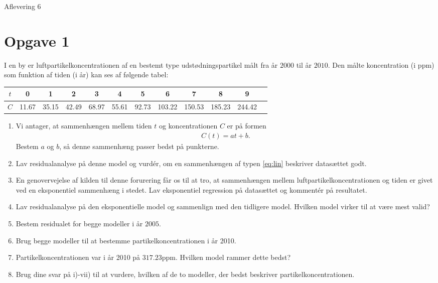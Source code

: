 
\begin{center}
\Huge
Aflevering 6
\end{center}
\section*{Opgave 1}

I en by er luftpartikelkoncentrationen af en bestemt type udstødningspartikel målt fra år $2000$ til år $2010$. Den målte koncentration (i ppm) som funktion af tiden (i år) kan ses af følgende tabel:
\begin{center}
\begin{tabular}{c|c|c|c|c|c|c|c|c|c|c|c}
$t$  & 0 & 1 & 2 & 3 & 4 & 5 & 6 & 7 & 8 & 9  \\
\hline
$C$  &11.67 & 35.15 & 42.49 & 68.97 & 55.61 & 92.73 & 103.22 & 150.53 & 185.23 & 244.42
\end{tabular}
\end{center}

\begin{enumerate}[label=\roman*)]
\item Vi antager, at sammenhængen mellem tiden $t$ og koncentrationen $C$ er på formen
\begin{align}\label{eq:lin}
C(t) = at+b.
\end{align}
Bestem $a$ og $b$, så denne sammenhæng passer bedst på punkterne. 
\item Lav residualanalyse på denne model og vurdér, om en sammenhængen af typen \eqref{eq:lin} beskriver datasættet godt.
\item En genovervejelse af kilden til denne forurering får os til at tro, at sammenhængen mellem luftpartikelkoncentrationen og tiden er givet ved en eksponentiel sammenhæng i stedet. Lav eksponentiel regression på datasættet og kommentér på resultatet.
\item Lav residualanalyse på den eksponentielle model og sammenlign med den tidligere model. Hvilken model virker til at være mest valid?
\item Bestem residualet for begge modeller i år $2005$.
\item Brug begge modeller til at bestemme partikelkoncentrationen i år 2010.
\item Partikelkoncentrationen var i år 2010 på $317.23$ppm. Hvilken model rammer dette bedst?
\item Brug dine svar på i)-vii) til at vurdere, hvilken af de to modeller, der bedst beskriver partikelkoncentrationen. 
\end{enumerate}


